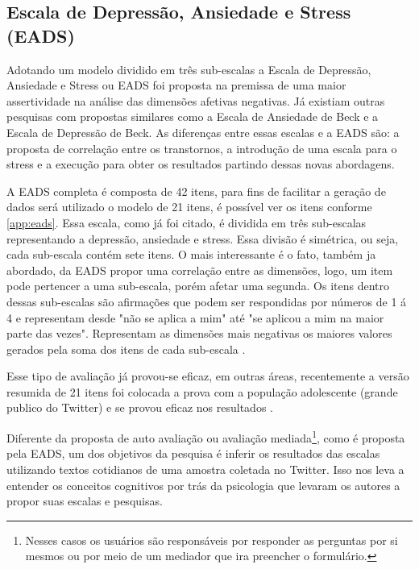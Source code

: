 \subsection{Escala de Depressão, Ansiedade e Stress (EADS)}
Adotando um modelo dividido em três sub-escalas a Escala de Depressão, Ansiedade e Stress ou EADS foi proposta na premissa de uma maior assertividade na análise das dimensões afetivas negativas. Já existiam outras pesquisas com propostas similares como a Escala de Ansiedade de Beck e a Escala de Depressão de Beck. As diferenças entre essas escalas e a EADS são: a proposta de correlação entre os transtornos, a introdução de uma escala para o stress e a execução para obter os resultados partindo dessas novas abordagens.

A EADS completa é composta de 42 itens, para fins de facilitar a geração de dados será utilizado o modelo de 21 itens, é possível ver os itens conforme \ref{app:eads}. Essa escala, como já foi citado, é dividida em três sub-escalas representando a depressão, ansiedade e stress. Essa divisão é simétrica, ou seja, cada sub-escala contém sete itens. O mais interessante é o fato, também ja abordado, da EADS propor uma correlação entre as dimensões, logo, um item pode pertencer a uma sub-escala, porém afetar uma segunda. Os itens dentro dessas sub-escalas são afirmações que podem ser respondidas por números de 1 á 4 e representam desde "não se aplica a mim" até "se aplicou a mim na maior parte das vezes". Representam as dimensões mais negativas os maiores valores gerados pela soma dos itens de cada sub-escala \cite{lovibond1995structure, ribeiro2004contribuiccao}.

Esse tipo de avaliação já provou-se eficaz, em outras áreas, recentemente a versão resumida de 21 itens foi colocada a prova com a população adolescente (grande publico do Twitter) e se provou eficaz nos resultados \cite{daversao}.

Diferente da proposta de auto avaliação ou avaliação mediada\footnote{Nesses casos os usuários são responsáveis por responder as perguntas por si mesmos ou por meio de um mediador que ira preencher o formulário.}, como é proposta pela EADS,  um dos objetivos da pesquisa é inferir os resultados das escalas utilizando textos cotidianos de uma amostra coletada no Twitter. Isso nos leva a entender os conceitos cognitivos por trás da psicologia que levaram os autores a propor suas escalas e pesquisas.
